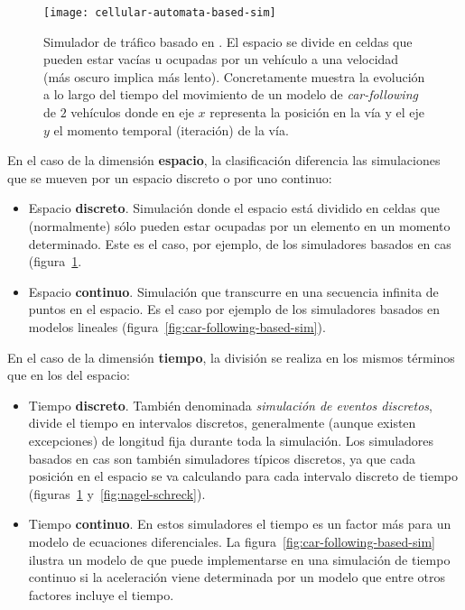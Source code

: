 \begin{figure}
	\centering
	\texttt{[image: cellular-automata-based-sim]}
	\caption[Ejemplo de simulador basado en ]{Simulador de tráfico basado en . El espacio se divide en celdas que pueden estar vacías u ocupadas por un vehículo a una velocidad (más oscuro implica más lento). Concretamente muestra la evolución a lo largo del tiempo del movimiento de un modelo de \textit{car-following} de $2$ vehículos donde en eje $x$ representa la posición en la vía y el eje $y$ el momento temporal (iteración) de la vía.}
	\label{fig:cellular-automata-based-sim}
\end{figure}

En el caso de la dimensión \textbf{espacio}, la clasificación diferencia las simulaciones que se mueven por un espacio discreto o por uno continuo:

\begin{itemize}
	\item Espacio \textbf{discreto}. Simulación donde el espacio está dividido en celdas que (normalmente) sólo pueden estar ocupadas por un elemento en un momento determinado. Este es el caso, por ejemplo, de los simuladores basados en \acp{ca} (figura~\ref{fig:cellular-automata-based-sim}.
	\item Espacio \textbf{continuo}. Simulación que transcurre en una secuencia infinita de puntos en el espacio. Es el caso por ejemplo de los simuladores basados en modelos lineales (figura~\ref{fig:car-following-based-sim}).
\end{itemize}

En el caso de la dimensión \textbf{tiempo}, la división se realiza en los mismos términos que en los del espacio:

\begin{itemize}
	\item Tiempo \textbf{discreto}. También denominada \textit{simulación de eventos discretos}, divide el tiempo en intervalos discretos, generalmente (aunque existen excepciones) de longitud fija durante toda la simulación. Los simuladores basados en \acp{ca} son también simuladores típicos discretos, ya que cada posición en el espacio se va calculando para cada intervalo discreto de tiempo (figuras~\ref{fig:cellular-automata-based-sim} y~\ref{fig:nagel-schreck}).
	\item Tiempo \textbf{continuo}. En estos simuladores el tiempo es un factor más para un modelo de ecuaciones diferenciales. La figura~\ref{fig:car-following-based-sim} ilustra un modelo de \textit{} que puede implementarse en una simulación de tiempo continuo si la aceleración viene determinada por un modelo que entre otros factores incluye el tiempo.
\end{itemize}

